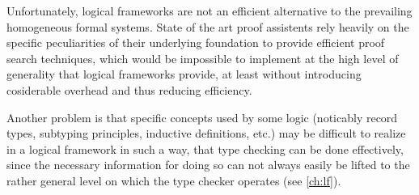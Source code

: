 Unfortunately, logical frameworks are not an efficient alternative to the prevailing homogeneous formal systems. State of the art proof assistents rely heavily on the specific peculiarities of their underlying foundation to provide efficient proof search techniques, which would be impossible to implement at the high level of generality that logical frameworks provide, at least without introducing cosiderable overhead and thus reducing efficiency.

Another problem is that specific concepts used by some logic (noticably record types, subtyping principles, inductive definitions, etc.) may be difficult to realize in a logical framework in such a way, that type checking can be done effectively, since the necessary information for doing so can not always easily be lifted to the rather general level on which the type checker operates (see \autoref{ch:lf}).

%




